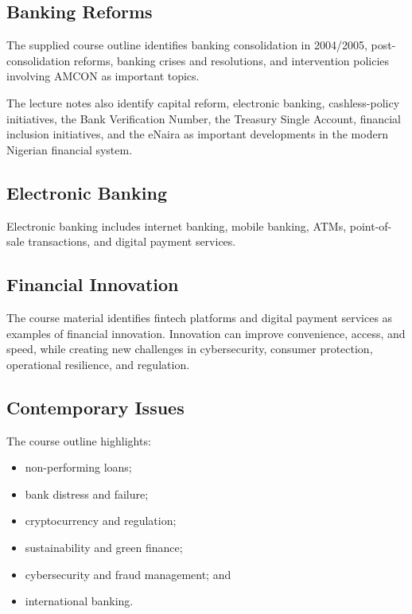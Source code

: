 \documentclass[
]{article}
\providecommand{\tightlist}{%
  \setlength{\itemsep}{0pt}\setlength{\parskip}{0pt}}
\begin{document}
\subsection{Banking Reforms}\label{banking-reforms}

The supplied course outline identifies banking consolidation in 2004/2005, post-consolidation reforms, banking crises and resolutions, and intervention policies involving AMCON as important topics.

The lecture notes also identify capital reform, electronic banking, cashless-policy initiatives, the Bank Verification Number, the Treasury Single Account, financial inclusion initiatives, and the eNaira as important developments in the modern Nigerian financial system.

\subsection{Electronic Banking}\label{electronic-banking-1}

Electronic banking includes internet banking, mobile banking, ATMs, point-of-sale transactions, and digital payment services.

\subsection{Financial Innovation}\label{financial-innovation}

The course material identifies fintech platforms and digital payment services as examples of financial innovation. Innovation can improve convenience, access, and speed, while creating new challenges in cybersecurity, consumer protection, operational resilience, and regulation.

\subsection{Contemporary Issues}\label{contemporary-issues}

The course outline highlights:

\begin{itemize}
\tightlist
\item
  non-performing loans;
\item
  bank distress and failure;
\item
  cryptocurrency and regulation;
\item
  sustainability and green finance;
\item
  cybersecurity and fraud management; and
\item
  international banking.
\end{itemize}
\end{document}
